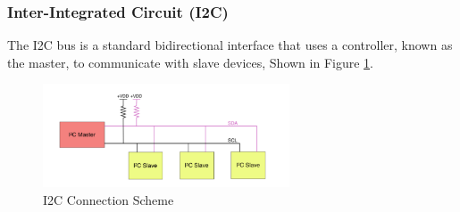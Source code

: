 \documentclass[english]{article}
\begin{document}
\subsubsection{Inter-Integrated Circuit (I2C)}
The I2C bus is a standard bidirectional interface that uses a controller, known as
the master, to communicate with slave devices, Shown in Figure \ref{fig:I2C}. 
\begin{figure}[!h]
	\centering
	\includegraphics[width=0.65\textwidth,]{figures/I2C_Connection.png}
	\caption{I2C Connection Scheme}
	\label{fig:I2C}
\end{figure}
\end{document}
